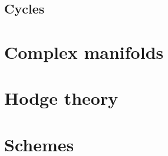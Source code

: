 \documentclass[10pt]{article}
\theoremstyle{definition}
\begin{document}
\subsection{Cycles}
\label{ch:9.11}


\section{Complex manifolds}
\label{ch:10}

\section{Hodge theory}
\label{ch:11}

\section{Schemes}
\label{ch:12}







\end{document}

